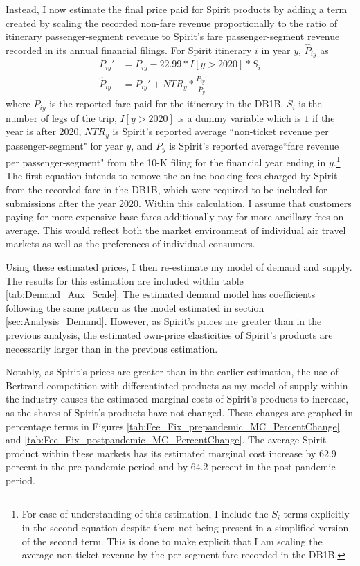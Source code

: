 \documentclass{article}
\begin{document}
    Instead, I now estimate the final price paid for Spirit products by adding a term created by scaling the recorded non-fare revenue proportionally to the ratio of itinerary passenger-segment revenue to Spirit's fare passenger-segment revenue recorded in its annual financial filings. For Spirit itinerary $i$ in year $y$, $\hat{P}_{iy} $ as \begin{equation}
    \begin{split}
      P_{iy}' &= P_{iy} - 22.99 * I[y > 2020] * S_{i}\\
 \hat{P}_{iy} &= P_{iy}' + NTR_{y} * \frac{P_{iy}'}{\bar{P}_{y}}     \end{split}
    \end{equation} where ${P}_{iy}$ is the reported fare paid for the itinerary in the DB1B, $S_{i}$ is the number of legs of the trip, $I[y > 2020]$ is a dummy variable which is $1$ if the year is after 2020, $NTR_{y}$ is Spirit's reported average ``non-ticket revenue per passenger-segment" for year $y$, and $\bar{P}_{y}$ is Spirit's reported average``fare revenue per passenger-segment" from the 10-K filing for the financial year ending in $y$.\footnote{For ease of understanding of this estimation, I include the $S_{i}$ terms explicitly in the second equation despite them not being present in a simplified version of the second term. This is done to make explicit that I am scaling the average non-ticket revenue by the per-segment fare recorded in the DB1B. } The first equation intends to remove the online booking fees charged by Spirit from the recorded fare in the DB1B, which were required to be included for submissions after the year 2020. Within this calculation, I assume that customers paying for more expensive base fares additionally pay for more ancillary fees on average. This would reflect both the market environment of individual air travel markets as well as the preferences of individual consumers. 

    Using these estimated prices, I then re-estimate my model of demand and supply. The results for this estimation are included within table \ref{tab:Demand_Aux_Scale}. The estimated demand model has coefficients following the same pattern as the model estimated in section \ref{sec:Analysis_Demand}. However, as Spirit's prices are greater than in the previous analysis, the estimated own-price elasticities of Spirit's products are necessarily larger than in the previous estimation. 

    Notably, as Spirit's prices are greater than in the earlier estimation, the use of Bertrand competition with differentiated products as my model of supply within the industry causes the estimated marginal costs of Spirit's products to increase, as the shares of Spirit's products have not changed. These changes are graphed in percentage terms in Figures  \ref{tab:Fee_Fix_prepandemic_MC_PercentChange} and    \ref{tab:Fee_Fix_postpandemic_MC_PercentChange}. The average Spirit product within these markets has its estimated marginal cost increase by 62.9 percent in the pre-pandemic period and by 64.2 percent in the post-pandemic period. 
    
\end{document}
